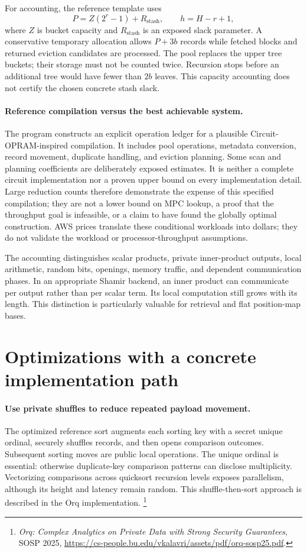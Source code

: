 For accounting, the reference template uses
\[
 P=Z(2^r-1)+R_{\mathrm{stash}},\qquad h=H-r+1,
\]
where $Z$ is bucket capacity and $R_{\mathrm{stash}}$ is an exposed slack
parameter. A conservative temporary allocation allows $P+3b$ records while
fetched blocks and returned eviction candidates are processed. The pool
replaces the upper tree buckets; their storage must not be counted twice.
Recursion stops before an additional tree would have fewer than $2b$ leaves.
This capacity accounting does not certify the chosen concrete stash slack.

\paragraph{Reference compilation versus the best achievable system.}
The program constructs an explicit operation ledger for a plausible
Circuit-OPRAM-inspired compilation. It includes pool operations, metadata
conversion, record movement, duplicate handling, and eviction planning. Some
scan and planning coefficients are deliberately exposed estimates. It is
neither a complete circuit implementation nor a proven upper bound on every
implementation detail. Large reduction counts therefore demonstrate the
expense of this specified compilation; they are not a lower bound on MPC
lookup, a proof that the throughput goal is infeasible, or a claim to have
found the globally optimal construction. AWS prices translate these
conditional workloads into dollars; they do not validate the workload or
processor-throughput assumptions.

The accounting distinguishes scalar products, private inner-product outputs,
local arithmetic, random bits, openings, memory traffic, and dependent
communication phases. In an appropriate Shamir backend, an inner product
can communicate per output rather than per scalar term. Its local
computation still grows with its length. This distinction is particularly
valuable for retrieval and flat position-map bases.

\section{Optimizations with a concrete implementation path}

\paragraph{Use private shuffles to reduce repeated payload movement.}
The optimized reference sort augments each sorting key with a secret unique
ordinal, securely shuffles records, and then opens comparison outcomes.
Subsequent sorting moves are public local operations. The unique ordinal is
essential: otherwise duplicate-key comparison patterns can disclose
multiplicity. Vectorizing comparisons across quicksort recursion levels
exposes parallelism, although its height and latency remain random.
This shuffle-then-sort approach is described in the Orq implementation.
\footnote{\emph{Orq: Complex Analytics on Private Data with Strong Security
Guarantees}, SOSP 2025,
\url{https://cs-people.bu.edu/vkalavri/assets/pdf/orq-sosp25.pdf}.}

